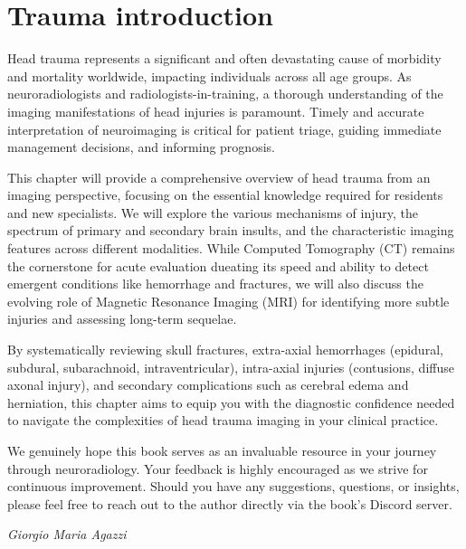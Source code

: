 \chapter{Trauma introduction}

Head trauma represents a significant and often devastating cause of morbidity and mortality worldwide, impacting individuals across all age groups. As neuroradiologists and radiologists-in-training, a thorough understanding of the imaging manifestations of head injuries is paramount. Timely and accurate interpretation of neuroimaging is critical for patient triage, guiding immediate management decisions, and informing prognosis.

This chapter will provide a comprehensive overview of head trauma from an imaging perspective, focusing on the essential knowledge required for residents and new specialists. We will explore the various mechanisms of injury, the spectrum of primary and secondary brain insults, and the characteristic imaging features across different modalities. While Computed Tomography (CT) remains the cornerstone for acute evaluation dueating its speed and ability to detect emergent conditions like hemorrhage and fractures, we will also discuss the evolving role of Magnetic Resonance Imaging (MRI) for identifying more subtle injuries and assessing long-term sequelae.

By systematically reviewing skull fractures, extra-axial hemorrhages (epidural, subdural, subarachnoid, intraventricular), intra-axial injuries (contusions, diffuse axonal injury), and secondary complications such as cerebral edema and herniation, this chapter aims to equip you with the diagnostic confidence needed to navigate the complexities of head trauma imaging in your clinical practice.

We genuinely hope this book serves as an invaluable resource in your journey through neuroradiology. Your feedback is highly encouraged as we strive for continuous improvement. Should you have any suggestions, questions, or insights, please feel free to reach out to the author directly via the book's Discord server.

\textit{Giorgio Maria Agazzi}
